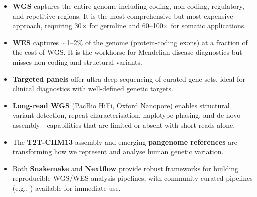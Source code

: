 \begin{keyconcept}[title={Chapter Summary}]
\begin{itemize}[nosep]
  \item \textbf{WGS} captures the entire genome including coding, non-coding, regulatory, and repetitive regions. It is the most comprehensive but most expensive approach, requiring 30$\times$ for germline and 60--100$\times$ for somatic applications.
  \item \textbf{WES} captures $\sim$1--2\% of the genome (protein-coding exons) at a fraction of the cost of WGS. It is the workhorse for Mendelian disease diagnostics but misses non-coding and structural variants.
  \item \textbf{Targeted panels} offer ultra-deep sequencing of curated gene sets, ideal for clinical diagnostics with well-defined genetic targets.
  \item \textbf{Long-read WGS} (PacBio HiFi, Oxford Nanopore) enables structural variant detection, repeat characterisation, haplotype phasing, and de novo assembly---capabilities that are limited or absent with short reads alone.
  \item The \textbf{T2T-CHM13} assembly and emerging \textbf{pangenome references} are transforming how we represent and analyse human genetic variation.
  \item Both \textbf{Snakemake} and \textbf{Nextflow} provide robust frameworks for building reproducible WGS/WES analysis pipelines, with community-curated pipelines (e.g., ) available for immediate use.
\end{itemize}
\end{keyconcept}
